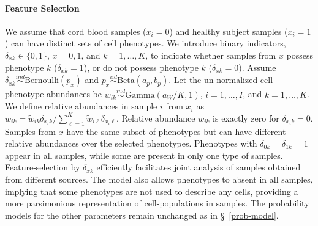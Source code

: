 \documentclass[12pt]{article} %
\newcommand{\G}{ \text{Gamma} }
\newcommand{\iid}{\overset{iid}{\sim}}
\newcommand{\ind}{\overset{ind}{\sim}}
\begin{document}
\paragraph*{Feature Selection} We assume that cord blood samples ($x_i=0$) and
healthy subject samples ($x_i=1$) can have distinct sets of cell phenotypes.
We introduce binary indicators, $\delta_{xk}\in \{0, 1\}$, $x=0,1$, and
$k=1,\ldots, K$, to indicate whether samples from $x$ possess phenotype $k$
($\delta_{xk}=1$), or do not possess phenotype $k$ ($\delta_{xk}=0$). Assume
$\delta_{xk} \ind \text{Bernoulli}(p_{x})$ and $p_x \iid \text{Beta}(a_p, b_p)$.  Let
the un-normalized cell phenotype abundances be $\tilde w_{ik} \ind \G(a_W/K,
1)$, $i=1, \ldots, I$, and $k=1, \ldots, K$. We define relative abundances in
sample $i$ from $x_i$ as 
$
w_{ik} =\tilde w_{ik} \delta_{x_i k}/\sum_{\ell=1}^K\tilde w_{i\ell} \delta_{x_i \ell}.
$
Relative abundance $w_{ik}$ is exactly zero for $\delta_{x_ik}=0$. Samples
from $x$ have the same subset of phenotypes but can have different relative
abundances over the selected phenotypes. Phenotypes with
$\delta_{0k}=\delta_{1k}=1$ appear in all samples, while some are present in only
one type of samples. Feature-selection by $\delta_{xk}$ efficiently facilitates
joint analysis of samples obtained from different sources. The model also
allows phenotypes to absent in all samples, implying that some phenotypes are not
used to describe any cells, providing a more parsimonious representation of 
cell-populations in samples. The probability models for the other parameters
remain unchanged as in \S~\ref{prob-model}.  



\end{document}
